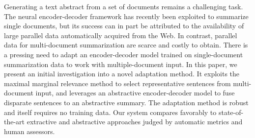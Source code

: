 Generating a text abstract from a set of documents remains a challenging task. The neural encoder-decoder framework has recently been exploited to summarize single documents, but its success can in part be attributed to the availability of large parallel data automatically acquired from the Web. In contrast, parallel data for multi-document summarization are scarce and costly to obtain. There is a pressing need to adapt an encoder-decoder model trained on single-document summarization data to work with multiple-document input. In this paper, we present an initial investigation into a novel adaptation method. It exploits the maximal marginal relevance method to select representative sentences from multi-document input, and leverages an abstractive encoder-decoder model to fuse disparate sentences to an abstractive summary. The adaptation method is robust and itself requires no training data. Our system compares favorably to state-of-the-art extractive and abstractive approaches judged by automatic metrics and human assessors.
